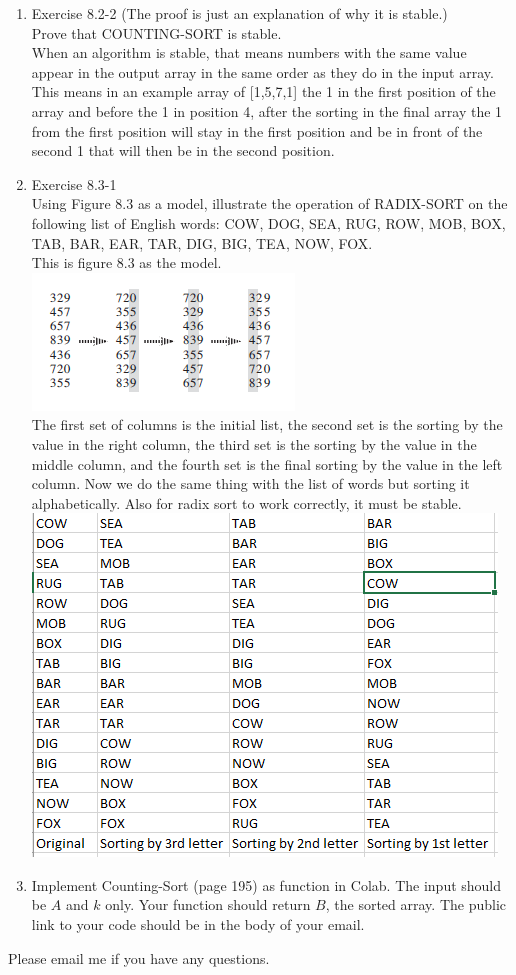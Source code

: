 \documentclass[12pt]{article}
\begin{document}
\begin{enumerate}
\item Exercise 8.2-2 (The proof is just an explanation of why it is stable.) \\
Prove that COUNTING-SORT is stable. \\
When an algorithm is stable, that means numbers with the same value appear in the output array in the same order as they do in the input array. This means in an example array of [1,5,7,1] the 1 in the first position of the array and before the 1 in position 4, after the sorting in the final array the 1 from the first position will stay in the first position and be in front of the second 1 that will then be in the second position.

\item Exercise 8.3-1 \\
Using Figure 8.3 as a model, illustrate the operation of RADIX-SORT on the following list of English words: COW, DOG, SEA, RUG, ROW, MOB, BOX, TAB, BAR, EAR, TAR, DIG, BIG, TEA, NOW, FOX.\\
This is figure 8.3 as the model.\\
\includegraphics[scale=1]{radix.png} \\
The first set of columns is the initial list, the second set is the sorting by the value in the right column, the third set is the sorting by the value in the middle column, and the fourth set is the final sorting by the value in the left column. Now we do the same thing with the list of words but sorting it alphabetically. Also for radix sort to work correctly, it must be stable.\\
\includegraphics[scale=1]{Radix2.png}

\item Implement Counting-Sort (page 195) as function in Colab. The input should be $A$ and $k$ only. Your function should return $B$, the sorted array. The public link to your code should be in the body of your email.

\end{enumerate}
 
 
 Please email me if you have any questions.

 
\end{document}
